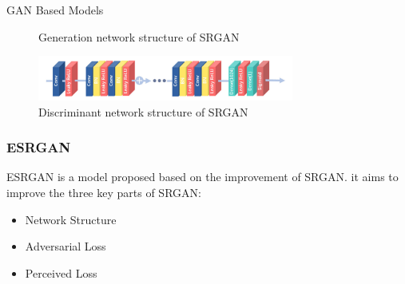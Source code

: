 \documentclass[11pt, presentation]{beamer}
\begin{document}
\begin{section}{GAN Based Models}
\begin{frame}
{\begin{figure}
                \caption{Generation network structure of SRGAN~\cite{li2020}}
                \label{fig:srgan-generator}
                \end{figure}
                \begin{figure}
                \includegraphics[width=0.75\textwidth]{images/srgan-dis}
                \caption{Discriminant network structure of SRGAN~\cite{li2020}}
                \label{fig:srgan-discriminator}
                \end{figure}


            }
        \end{frame}
        \begin{frame}
            \frametitle{ESRGAN}
            ESRGAN is a model proposed based on the improvement of SRGAN.
            it aims to improve the three key parts of SRGAN:
            \begin{itemize}
                \item Network Structure
                \item Adversarial Loss
                \item Perceived Loss
            \end{itemize}


\end{frame}
\end{section}
\end{document}
